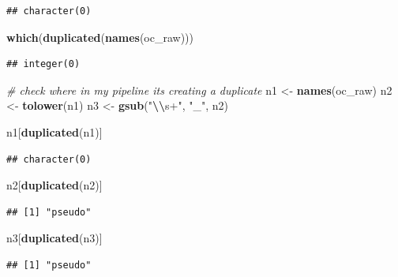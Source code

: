 \documentclass[
]{article}
\newenvironment{Shaded}{\begin{snugshade}}{\end{snugshade}}
\newcommand{\CommentTok}[1]{\textcolor[rgb]{0.56,0.35,0.01}{\textit{#1}}}
\newcommand{\FunctionTok}[1]{\textcolor[rgb]{0.13,0.29,0.53}{\textbf{#1}}}
\newcommand{\NormalTok}[1]{#1}
\newcommand{\OtherTok}[1]{\textcolor[rgb]{0.56,0.35,0.01}{#1}}
\newcommand{\SpecialCharTok}[1]{\textcolor[rgb]{0.81,0.36,0.00}{\textbf{#1}}}
\newcommand{\StringTok}[1]{\textcolor[rgb]{0.31,0.60,0.02}{#1}}
\begin{document}
\begin{verbatim}
## character(0)
\end{verbatim}

\begin{Shaded}
\begin{Highlighting}[]
\FunctionTok{which}\NormalTok{(}\FunctionTok{duplicated}\NormalTok{(}\FunctionTok{names}\NormalTok{(oc\_raw)))}
\end{Highlighting}
\end{Shaded}

\begin{verbatim}
## integer(0)
\end{verbatim}

\begin{Shaded}
\begin{Highlighting}[]
\CommentTok{\# check where in my pipeline its creating a duplicate}
\NormalTok{n1 }\OtherTok{\textless{}{-}} \FunctionTok{names}\NormalTok{(oc\_raw)}
\NormalTok{n2 }\OtherTok{\textless{}{-}} \FunctionTok{tolower}\NormalTok{(n1)}
\NormalTok{n3 }\OtherTok{\textless{}{-}} \FunctionTok{gsub}\NormalTok{(}\StringTok{"}\SpecialCharTok{\textbackslash{}\textbackslash{}}\StringTok{s+"}\NormalTok{, }\StringTok{"\_"}\NormalTok{, n2)}

\NormalTok{n1[}\FunctionTok{duplicated}\NormalTok{(n1)]}
\end{Highlighting}
\end{Shaded}

\begin{verbatim}
## character(0)
\end{verbatim}

\begin{Shaded}
\begin{Highlighting}[]
\NormalTok{n2[}\FunctionTok{duplicated}\NormalTok{(n2)]}
\end{Highlighting}
\end{Shaded}

\begin{verbatim}
## [1] "pseudo"
\end{verbatim}

\begin{Shaded}
\begin{Highlighting}[]
\NormalTok{n3[}\FunctionTok{duplicated}\NormalTok{(n3)]}
\end{Highlighting}
\end{Shaded}

\begin{verbatim}
## [1] "pseudo"
\end{verbatim}
\end{document}
